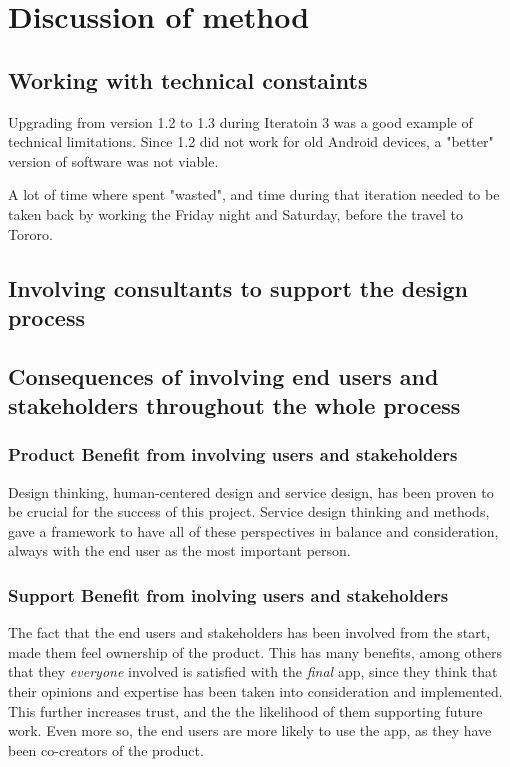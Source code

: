 \section{Discussion of method}

\subsection{Working with technical constaints}
Upgrading from version 1.2 to 1.3 during Iteratoin 3 was a good example of technical limitations. Since 1.2 did not work for old Android devices, a "better" version of software was not viable.

A lot of time where spent "wasted", and time during that iteration needed to be taken back by working the Friday night and Saturday, before the travel to Tororo.

\subsection{Involving consultants to support the design process}


\subsection{Consequences of involving end users and stakeholders throughout the whole process}

\subsubsection{Product Benefit from involving users and stakeholders}
Design thinking, human-centered design and service design, has been proven to be crucial for the success of this project. Service design thinking and methods, gave a framework to have all of these perspectives in balance and consideration, always with the end user as the most important person.

\subsubsection{Support Benefit from inolving users and stakeholders}
The fact that the end users and stakeholders has been involved from the start, made them feel ownership of the product. This has many benefits, among others that they \textit{everyone} involved is satisfied with the \textit{final} app, since they think that their opinions and expertise has been taken into consideration and implemented. This further increases trust, and the the likelihood of them supporting future work. Even more so, the end users are more likely to use the app, as they have been co-creators of the product.

